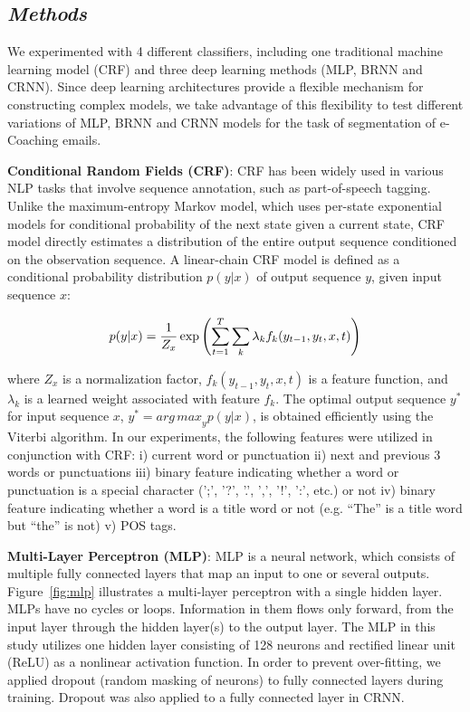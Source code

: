 \documentclass{amia}
\begin{document}
\subsection*{\textit{Methods}}

We experimented with 4 different classifiers, including one traditional machine learning model (CRF) and three deep learning methods (MLP, BRNN and CRNN). Since deep learning architectures provide a flexible mechanism for constructing complex models, we take advantage of this flexibility to test different variations of MLP, BRNN and CRNN models for the task of segmentation of e-Coaching emails.

\textbf{Conditional Random Fields (CRF)}: CRF has been widely used in various NLP tasks that involve sequence annotation, such as part-of-speech tagging.\cite{lafferty2001conditional, hirohata2008identifying} Unlike the maximum-entropy Markov model, which uses per-state exponential models for conditional probability of the next state given a current state, CRF model directly estimates a distribution of the entire output sequence conditioned on the observation sequence. A linear-chain CRF model is defined as a conditional probability distribution $p(y|x)$ of output sequence $y$, given input sequence $x$:

\begin{equation}
\label{Eq:crf}
p(y|x) = \frac{1}{Z_x}\exp{\left(\sum_{t=1}^{T}\sum_{k}^{}\lambda_k f_k(y_{t-1}, y_t, x, t)\right)} \\
\end{equation}

where $Z_x$ is a normalization factor, $f_k(y_{t-1}, y_t, x, t)$ is a feature function, and $\lambda_k$ is a learned weight associated with feature $f_k$. The optimal output sequence $y^*$ for input sequence $x$, $y^* = {arg\,max}_y p(y|x)$, is obtained efficiently using the Viterbi algorithm. In our experiments, the following features were utilized in conjunction with CRF: i) current word or punctuation ii) next and previous 3 words or punctuations iii) binary feature indicating whether a word or punctuation is a special character (';', '?', '.', ',', '!', ':', etc.) or not iv) binary feature indicating whether a word is a title word or not (e.g. ``The'' is a title word but ``the'' is not) v) POS tags.   

\textbf{Multi-Layer Perceptron (MLP)}: MLP is a neural network, which consists of multiple fully connected layers that map an input to one or several outputs.\cite{rumelhart1986learning} Figure~\ref{fig:mlp} illustrates a multi-layer perceptron with a single hidden layer. MLPs have no cycles or loops. Information in them flows only forward, from the input layer through the hidden layer(s) to the output layer. The MLP in this study utilizes one hidden layer consisting of 128 neurons and rectified linear unit (ReLU) as a nonlinear activation function. In order to prevent over-fitting, we applied dropout (random masking of neurons) \cite{srivastava2014dropout} to fully connected layers during training. Dropout was also applied to a fully connected layer in CRNN. 
\end{document}

